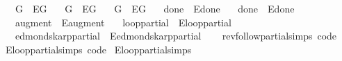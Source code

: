 \begin{isabellebody}
\ \ \ G{}{\isacharunderscore}{\kern0pt}{}\ {\isacharequal}{\kern0pt}\ E{\isachardot}{\kern0pt}G{}{\isacharunderscore}{\kern0pt}{}\isanewline
\ \ \ G{}\ {\isacharequal}{\kern0pt}\ E{\isachardot}{\kern0pt}G{}\isanewline
\ \ \ G{}\ {\isacharequal}{\kern0pt}\ E{\isachardot}{\kern0pt}G{}\isanewline
\ \ \ done{\isacharunderscore}{\kern0pt}{}\ {\isacharequal}{\kern0pt}\ E{\isachardot}{\kern0pt}done{\isacharunderscore}{\kern0pt}{}\isanewline
\ \ \ done{\isacharunderscore}{\kern0pt}{}\ {\isacharequal}{\kern0pt}\ E{\isachardot}{\kern0pt}done{\isacharunderscore}{\kern0pt}{}\isanewline
\ \ \ augment\ {\isacharequal}{\kern0pt}\ E{\isachardot}{\kern0pt}augment\isanewline
\ \ \ loop{\isacharprime}{\kern0pt}{\isacharunderscore}{\kern0pt}partial\ {\isacharequal}{\kern0pt}\ E{\isachardot}{\kern0pt}loop{\isacharprime}{\kern0pt}{\isacharunderscore}{\kern0pt}partial\isanewline
\ \ \ edmonds{\isacharunderscore}{\kern0pt}karp{\isacharunderscore}{\kern0pt}partial\ {\isacharequal}{\kern0pt}\ E{\isachardot}{\kern0pt}edmonds{\isacharunderscore}{\kern0pt}karp{\isacharunderscore}{\kern0pt}partial\isanewline
%
\isadelimproof
\ \ %
\endisadelimproof
%
\isatagproof
\isacommand{{\isachardot}{\kern0pt}{\isachardot}{\kern0pt}}\isamarkupfalse%
%
\endisatagproof
{\isafoldproof}%
%
\isadelimproof
\isanewline
%
\endisadelimproof
\isanewline
{}\isamarkupfalse%
\ rev{\isacharunderscore}{\kern0pt}follow{\isacharunderscore}{\kern0pt}partial{\isachardot}{\kern0pt}simps\ {\isacharbrackleft}{\kern0pt}code{\isacharbrackright}{\kern0pt}\isanewline
{}\isamarkupfalse%
\ E{\isachardot}{\kern0pt}loop{\isacharprime}{\kern0pt}{\isacharunderscore}{\kern0pt}partial{\isachardot}{\kern0pt}simps\ {\isacharbrackleft}{\kern0pt}code{\isacharbrackright}{\kern0pt}\isanewline
{}\isamarkupfalse%
\ E{\isachardot}{\kern0pt}loop{\isacharprime}{\kern0pt}{\isacharunderscore}{\kern0pt}partial{\isachardot}{\kern0pt}simps\isanewline
{}\isamarkupfalse%

\end{isabellebody}
